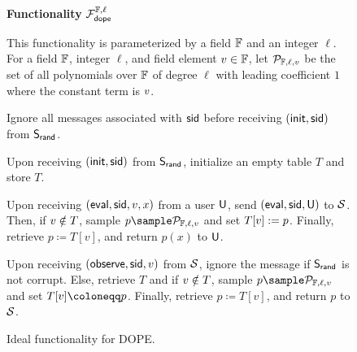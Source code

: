 \begin{figure}[h]
	\begin{center}
		\begin{techbox}
			\centerline{\textbf{Functionality} $\mathcal{F}_{\mathsf{dope}}^{\mathbb{F}, \ell}$}

			This functionality is parameterized by a field $\mathbb{F}$ and an integer $\ell$. For a field $\mathbb{F}$, integer $\ell$, and field element $v \in \mathbb{F}$, let $\mathcal{P}_{\mathbb{F}, \ell, v}$ be the set of all polynomials over $\mathbb{F}$ of degree $\ell$ with leading coefficient $1$ where the constant term is $v$.

			\boxsep

			Ignore all messages associated with ${\sf sid}$ before receiving $({\sf init}, {\sf sid})$ from $\mathsf{S}_{\mathsf{rand}}$.


			\begin{algenumerate}
				\item Upon receiving $({\sf init}, {\sf sid})$ from $\mathsf{S}_{\mathsf{rand}}$, initialize an empty table $T$ and store $T$.
				\item Upon receiving $({\sf eval}, {\sf sid}, v, x)$ from a user $\mathsf{U}$, send $({\sf eval}, {\sf sid}, \mathsf{U})$ to $\mathcal{S}$.
				Then, if $v \notin T$, sample $p \sample \Polys_{\field, \ell, \val}$ and set $T[v] := p$.
				Finally, retrieve $p \coloneqq T[v]$, and return $p(x)$ to $\mathsf{U}$.

				\item Upon receiving $(\mathsf{observe}, {\sf sid}, v)$ from $\mathcal{S}$, ignore the message if $\mathsf{S}_{\mathsf{rand}}$ is not corrupt.
				Else, retrieve $T$ and if $v \notin T$, sample $p \sample \Polys_{\field, \ell, \val}$ and set $T[\val] \coloneqq p$.
				Finally, retrieve $p \coloneqq T[v]$, and return $p$ to $\mathcal{S}$.
			\end{algenumerate}
		\end{techbox}
	\end{center}
	\caption{Ideal functionality for DOPE.}
	\label{fig:ideal_dope}
\end{figure}
